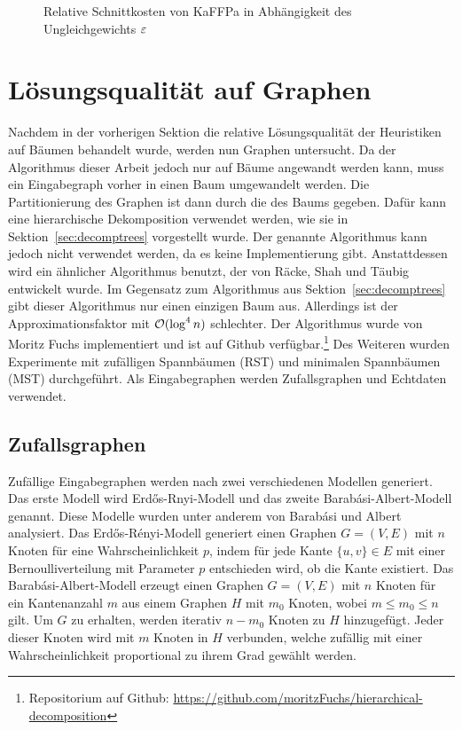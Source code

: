 \begin{figure}[H]
    \centering
    
    \caption{Relative Schnittkosten von KaFFPa in Abhängigkeit des Ungleichgewichts $\varepsilon$\label{fig:kaffpatreesimb}}
\end{figure}

\section{Lösungsqualität auf Graphen}
Nachdem in der vorherigen Sektion die relative Lösungsqualität der Heuristiken auf Bäumen behandelt wurde, werden nun Graphen untersucht.
Da der Algorithmus dieser Arbeit jedoch nur auf Bäume angewandt werden kann, muss ein Eingabegraph vorher in einen Baum umgewandelt werden.
Die Partitionierung des Graphen ist dann durch die des Baums gegeben.
Dafür kann eine hierarchische Dekomposition verwendet werden, wie sie in Sektion~\ref{sec:decomptrees} vorgestellt wurde.
Der genannte Algorithmus kann jedoch nicht verwendet werden, da es keine Implementierung gibt.
Anstattdessen wird ein ähnlicher Algorithmus benutzt, der von Räcke, Shah und Täubig~\cite{RST14} entwickelt wurde.
Im Gegensatz zum Algorithmus aus Sektion~\ref{sec:decomptrees} gibt dieser Algorithmus nur einen einzigen Baum aus.
Allerdings ist der Approximationsfaktor mit $\mathcal{O}(\log^4 n)$ schlechter.
Der Algorithmus wurde von Moritz Fuchs implementiert und ist auf Github verfügbar.\footnote{Repositorium auf Github: \url{https://github.com/moritzFuchs/hierarchical-decomposition}}
Des Weiteren wurden Experimente mit zufälligen Spannbäumen (RST) und minimalen Spannbäumen (MST) durchgeführt.
Als Eingabegraphen werden Zufallsgraphen und Echtdaten verwendet.

\subsection{Zufallsgraphen}
Zufällige Eingabegraphen werden nach zwei verschiedenen Modellen generiert.
Das erste Modell wird Erdős-Rnyi-Modell und das zweite Barabási-Albert-Modell genannt.
Diese Modelle wurden unter anderem von Barabási und Albert~\cite{AB02} analysiert.
Das Erdős-Rényi-Modell generiert einen Graphen $G=(V,E)$ mit $n$ Knoten für eine Wahrscheinlichkeit $p$, indem für jede Kante $\{u, v\} \in E$ mit einer Bernoulliverteilung mit Parameter $p$ entschieden wird, ob die Kante existiert.
Das Barabási-Albert-Modell erzeugt einen Graphen $G=(V,E)$ mit $n$ Knoten für ein Kantenanzahl $m$ aus einem Graphen $H$ mit $m_0$ Knoten, wobei $m \leq m_0 \leq n$ gilt.
Um $G$ zu erhalten, werden iterativ $n - m_0$ Knoten zu $H$ hinzugefügt.
Jeder dieser Knoten wird mit $m$ Knoten in $H$ verbunden, welche zufällig mit einer Wahrscheinlichkeit proportional zu ihrem Grad gewählt werden.

